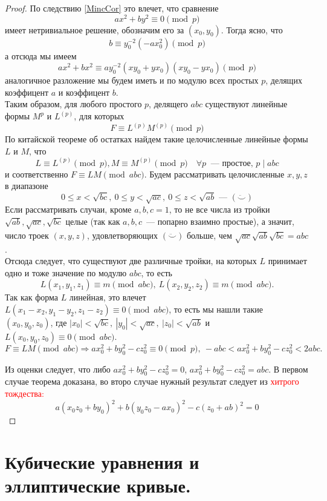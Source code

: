 \documentclass[11pt]{report}
\begin{document}
\begin{proof}
        По следствию \ref{MincCor} это влечет, что сравнение
        \[ ax^2 + by^2 \equiv 0 \pmod{p} \]
        имеет нетривиальное решение, обозначим его за $(x_0, y_0)$. Тогда ясно, что
        \[ b \equiv y_0^{-2} (-ax_0^2) \pmod{p}\]
        а отсюда мы имеем
        \[ ax^2 + bx^2 \equiv a y_0^{-2} (x y_0 + y x_0)(x y_0 - y x_0) \pmod{p} \]
        аналогичное разложение мы будем иметь и по модулю всех простых $p$, делящих коэффицент $a$ и коэффицент $b$.\\
        Таким образом, для любого простого $p$, делящего $abc$ существуют линейные формы $M^{p}$ и $L^{(p)}$, для которых
        \[ F \equiv L^{(p)} M^{(p)} \pmod{p} \]
        По китайской теореме об остатках найдем такие целочисленные линейные формы $L$ и $M$, что
        \[ L \equiv L^{(p)} \pmod{p}, M \equiv M^{(p)} \pmod{p} \quad \forall p \ \text{~--- простое, } p \mid abc \]
        и соответственно $F \equiv LM \pmod{abc}$. Будем рассматривать целочисленные $x, y, z$ в диапазоне
        \[ 0 \le x < \sqrt{bc}, \ 0 \le y < \sqrt{ac}, \ 0 \le z < \sqrt{ab} \text{~--- } (\ddot\smile) \]
        Если рассматривать случаи, кроме $a, b, c = 1$, то не все числа из тройки $\sqrt{ab}, \sqrt{ac}, \sqrt{bc}$ целые (так как $a, b, c$~--- попарно взаимно простые), а значит,
        число троек $(x, y, z)$, удовлетворяющих $(\ddot\smile)$ больше, чем $\sqrt{ac} \sqrt{ab}\sqrt{bc} = abc$.\\

        Отсюда следует, что существуют две различные тройки, на которых $L$ принимает одно и тоже значение по модулю $abc$, то есть
        \[ L(x_1, y_1, z_1) \equiv m \pmod{abc} , \ L(x_2, y_2, z_2) \equiv m \pmod{abc}.\]
        Так как форма $L$ линейная, это влечет $L(x_1 - x_2, y_1 - y_2, z_1 - z_2) \equiv 0 \pmod{abc}$, то есть мы нашли такие
        $(x_0, y_0, z_0)$, где $|x_0| < \sqrt{bc}, \ |y_0| < \sqrt{ac}, \ |z_0| < \sqrt{ab}$ и $L(x_0, y_0, z_0) \equiv 0 \pmod{abc}$.
        \[ F \equiv L M \pmod{abc} \Rightarrow a x_0^2 + b y_0^2 - c z_0^2 \equiv 0 \pmod{p} , \ -abc < ax_0^2 + by_0^2 - cz_0^2 < 2abc. \]

        Из оценки следует, что либо $a x_{0}^2 + b y_0^2 - cz_0^2 = 0$, $a x_{0}^2 + b y_0^2 - cz_0^2 = abc$. В первом случае теорема доказана, во второ случае
        нужный результат следует из \textcolor{red}{хитрого тождества:}
        \[ a(x_0 z_0 + b y_0)^2 + b(y_0 z_0 - a x_0)^2 - c(z_0 + ab)^2 = 0 \]

    \end{proof}
    \section{Кубические уравнения и эллиптические кривые.}
\end{document}
